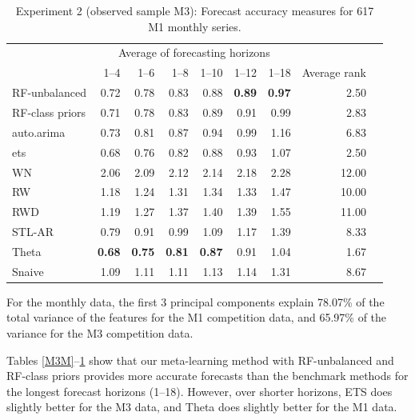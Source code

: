 \documentclass[11pt,a4paper,]{article}
\theoremstyle{definition}
\theoremstyle{definition}
\theoremstyle{definition}
\theoremstyle{remark}
\begin{document}
\begin{table}[!h]
\centering\small
\caption{Experiment 2 (observed sample M3): Forecast accuracy measures for 617 M1 monthly series.}
\label{M1M}
\begin{tabular}{lrrrrrrrl}
\toprule
 & \multicolumn{6}{c}{Average of forecasting horizons}    &  \\ 
                & 1--4      & 1--6      & 1--8      & 1--10     & 1--12      & 1--18     & Average rank  \\
\midrule
RF-unbalanced   & 0.72      & 0.78      & 0.83      & 0.88      & \bf{ 0.89} & \bf{0.97} & 2.50  \\
RF-class priors & 0.71      & 0.78      & 0.83      & 0.89      & 0.91       & 0.99      & 2.83  \\
auto.arima      & 0.73      & 0.81      & 0.87      & 0.94      & 0.99       & 1.16      & 6.83   \\
ets             & 0.68      & 0.76      & 0.82      & 0.88      & 0.93       & 1.07      & 2.50   \\
WN              & 2.06      & 2.09      & 2.12      & 2.14      & 2.18       & 2.28      & 12.00   \\
RW              & 1.18      & 1.24      & 1.31      & 1.34      & 1.33       & 1.47      & 10.00 \\
RWD             & 1.19      & 1.27      & 1.37      & 1.40      & 1.39       & 1.55      & 11.00  \\
STL-AR          & 0.79      & 0.91      & 0.99      & 1.09      & 1.17       & 1.39      & 8.33  \\
Theta           & \bf{0.68} & \bf{0.75} & \bf{0.81} & \bf{0.87} & 0.91       & 1.04      & 1.67    \\
Snaive          & 1.09      & 1.11      & 1.11      & 1.13      & 1.14       & 1.31      & 8.67\\
\bottomrule
\end{tabular}
\end{table}

For the monthly data, the first 3 principal components explain 78.07\%
of the total variance of the features for the M1 competition data, and
65.97\% of the variance for the M3 competition data.

Tables \ref{M3M}--\ref{M1M} show that our meta-learning method with
RF-unbalanced and RF-class priors provides more accurate forecasts than
the benchmark methods for the longest forecast horizons (1--18).
However, over shorter horizons, ETS does slightly better for the M3
data, and Theta does slightly better for the M1 data.
\end{document}
